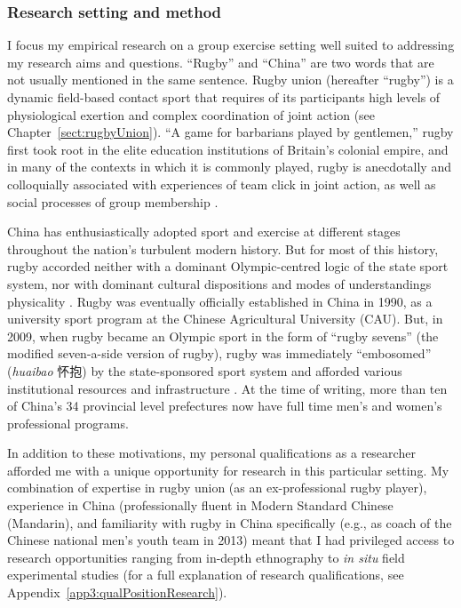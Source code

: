 \begin{CJK}{UTF8}{gbsn}
\subsubsection{Research setting and method\label{sect:researchSettingMethod}}
I focus my empirical research on a group exercise setting well suited to addressing my research aims and questions.  ``Rugby'' and ``China'' are two words that are not usually mentioned in the same sentence.  Rugby union (hereafter ``rugby'') is a dynamic field-based contact sport that requires of its participants high levels of physiological exertion and complex coordination of joint action  (see Chapter~\ref{sect:rugbyUnion}). ``A game for barbarians played by gentlemen,'' rugby first took root in the elite education institutions of Britain's colonial empire, and in many of the contexts in which it is commonly played, rugby is anecdotally and colloquially associated with experiences of team click in joint action, as well as social processes of group membership \citep{Dunning2005}.

China has enthusiastically adopted sport and exercise at different stages throughout the nation's turbulent modern history.  But for most of this history, rugby accorded neither with a dominant Olympic-centred logic of the state sport system, nor with dominant cultural dispositions and modes of understandings physicality \citep[which derived from hundreds of years of continuous history of Confucian and Daoist traditions of thought, see][]{Morris2004}.  Rugby was eventually officially established in China in 1990, as a university sport program at the Chinese Agricultural University (CAU).  But, in 2009, when rugby became an Olympic sport in the form of ``rugby sevens'' (the modified seven-a-side version of rugby), rugby was immediately ``embosomed'' (\textit{huaibao} 怀抱) by the state-sponsored sport system and afforded various institutional resources and infrastructure \citep{Xu2010}.  At the time of writing, more than ten of China's 34 provincial level prefectures now have full time men's and women's professional programs.

In addition to these motivations, my personal qualifications as a researcher afforded me with a unique opportunity for research in this particular setting.  My combination of expertise in rugby union (as an ex-professional rugby player), experience in China (professionally fluent in Modern Standard Chinese (Mandarin), and familiarity with rugby in China specifically (e.g., as coach of the Chinese national men's youth team in 2013) meant that I had privileged access to research opportunities ranging from in-depth ethnography to \textit{in situ} field experimental studies (for a full explanation of research qualifications, see Appendix~\ref{app3:qualPositionResearch}).


\end{CJK}
